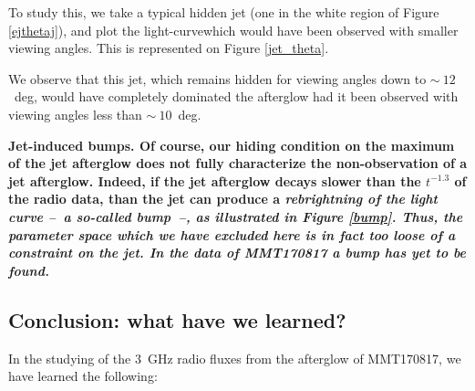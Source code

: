 To study this, we take a typical hidden jet (one in the white region of Figure \ref{ejthetaj}), and plot the light-curvewhich would have been observed with smaller viewing angles. This is represented on Figure \ref{jet_theta}.


We observe that this jet, which remains hidden for viewing angles down to $\sim~12$~deg, would have completely dominated the afterglow had it been observed with viewing angles less than $\sim~10$~deg.


\bf{Jet-induced bumps.} Of course, our hiding condition on the maximum of the jet afterglow does not fully characterize the non-observation of a jet afterglow. Indeed, if the jet afterglow decays slower than the $t^{-1.3}$ of the radio data, than the jet can produce a \it{rebrightning} of the light curve --~a so-called \it{bump}~--, as illustrated in Figure \ref{bump}. Thus, the parameter space which we have excluded here is in fact too loose of a constraint on the jet. In the data of MMT170817 a bump has yet to be found.



\subsection{Conclusion: what have we learned?}

In the studying of the 3~GHz radio fluxes from the afterglow of MMT170817, we have learned the following:


